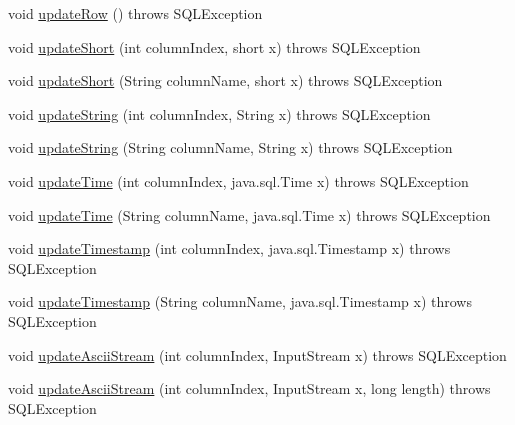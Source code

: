 \begin{DoxyCompactItemize}
\item 
void \mbox{\hyperlink{classcom_1_1mysql_1_1cj_1_1jdbc_1_1result_1_1_updatable_result_set_a929a525bf0cd169280f2395c1976352e}{update\+Row}} ()  throws S\+Q\+L\+Exception 
\item 
void \mbox{\hyperlink{classcom_1_1mysql_1_1cj_1_1jdbc_1_1result_1_1_updatable_result_set_a92a643f0027e935caeaa9a2430a83aeb}{update\+Short}} (int column\+Index, short x)  throws S\+Q\+L\+Exception 
\item 
void \mbox{\hyperlink{classcom_1_1mysql_1_1cj_1_1jdbc_1_1result_1_1_updatable_result_set_ae6723add8ad3b857b6ca770519b431e2}{update\+Short}} (String column\+Name, short x)  throws S\+Q\+L\+Exception 
\item 
void \mbox{\hyperlink{classcom_1_1mysql_1_1cj_1_1jdbc_1_1result_1_1_updatable_result_set_ae92687b0a474c336de90d90a9b110727}{update\+String}} (int column\+Index, String x)  throws S\+Q\+L\+Exception 
\item 
void \mbox{\hyperlink{classcom_1_1mysql_1_1cj_1_1jdbc_1_1result_1_1_updatable_result_set_a521010fdfe7806340f1ecb9b78bf920f}{update\+String}} (String column\+Name, String x)  throws S\+Q\+L\+Exception 
\item 
void \mbox{\hyperlink{classcom_1_1mysql_1_1cj_1_1jdbc_1_1result_1_1_updatable_result_set_ab3b8d2e10ec8801e792b49f9c8a81e03}{update\+Time}} (int column\+Index, java.\+sql.\+Time x)  throws S\+Q\+L\+Exception 
\item 
void \mbox{\hyperlink{classcom_1_1mysql_1_1cj_1_1jdbc_1_1result_1_1_updatable_result_set_a893725edd6953c0a7dfb64b97acd4a63}{update\+Time}} (String column\+Name, java.\+sql.\+Time x)  throws S\+Q\+L\+Exception 
\item 
void \mbox{\hyperlink{classcom_1_1mysql_1_1cj_1_1jdbc_1_1result_1_1_updatable_result_set_a0c7ee79e1a628e8582f9a66e5b130c04}{update\+Timestamp}} (int column\+Index, java.\+sql.\+Timestamp x)  throws S\+Q\+L\+Exception 
\item 
void \mbox{\hyperlink{classcom_1_1mysql_1_1cj_1_1jdbc_1_1result_1_1_updatable_result_set_a5ff5b19436b084f5ea9baf7e74209d21}{update\+Timestamp}} (String column\+Name, java.\+sql.\+Timestamp x)  throws S\+Q\+L\+Exception 
\item 
void \mbox{\hyperlink{classcom_1_1mysql_1_1cj_1_1jdbc_1_1result_1_1_updatable_result_set_a006fe90cea1b6aacbeb886245c355eec}{update\+Ascii\+Stream}} (int column\+Index, Input\+Stream x)  throws S\+Q\+L\+Exception 
\item 
void \mbox{\hyperlink{classcom_1_1mysql_1_1cj_1_1jdbc_1_1result_1_1_updatable_result_set_a2cbcdfde23935cce692af071e50342d5}{update\+Ascii\+Stream}} (int column\+Index, Input\+Stream x, long length)  throws S\+Q\+L\+Exception 

\end{DoxyCompactItemize}
